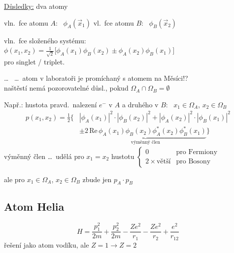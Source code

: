 \begin{minipage}{0.35\textwidth}
\underline{Důsledky:} dva atomy
\end{minipage}
\begin{minipage}{0.6\textwidth}
\end{minipage}

vln.\ fce atomu $A$: \ $\phi_A(\vec x_1)$ \hfill vl.\ fce atomu $B$: \ $\phi_B(\vec x_2)$

vln.\ fce složeného systému: \quad
$\phi(x_1,x_2) = \frac{1}{\sqrt2}\big[\phi_A(x_1)\phi_B(x_2) \pm \phi_A(x_2)\phi_B(x_1)\big]$ \\
\hspace*{9cm} pro singlet / triplet.

\dots\  \dots\ atom v laboratoři je promíchaný s atomem na Měsíci!? \\
naštěstí nemá pozorovatelné důsl., pokud $\Omega_A\cap\Omega_B = \emptyset$

Např.: hustota pravd.\ nalezení $e^-$ v $A$ a druhého v $B$: \ $x_1\in\Omega_A$, $x_2\in\Omega_B$
\begin{align*}
  p(x_1,x_2) = \tfrac12\Big\{&|\phi_A(x_1)|^2\cdot|\phi_B(x_2)|^2 + |\phi_A(x_2)|^2\cdot|\phi_B(x_1)|^2 \\
  &\pm \underbrace{2\,\mathrm{Re}\,\phi_A(x_1)\phi_B(x_2)\phi_A^*(x_2)\phi_B^*(x_1)}_{\text{výměnný člen}}\Big\}
\end{align*}
\quad výměnný člen \dots\ udělá pro $x_1 = x_2$ \quad hustotu \quad
$\begin{cases} 0 & \text{pro Fermiony} \\ 2\times\text{větší} & \text{pro Bosony}\end{cases}$

ale pro $x_1\in\Omega_A$, $x_2\in\Omega_B$ zbude jen $p_A\cdot p_B$

\subsection*{Atom Helia}
\[
  H = \frac{p_1^2}{2m} + \frac{p_2^2}{2m} - \frac{Ze^2}{r_1} - \frac{Ze^2}{r_2} + \boxed{\frac{e^2}{r_{12}}}
\]
řešení jako atom vodíku, ale $Z = 1\to Z = 2$

